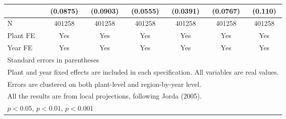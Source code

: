 \begin{table}[htbp]
\begin{tabular}{l*{6}{c}}
                & (0.0875)         & (0.0903)         & (0.0555)         & (0.0391)         & (0.0767)         &  (0.110)         \\
\midrule
N               &   401258         &   401258         &   401258         &   401258         &   401258         &   401258         \\
Plant FE        &      Yes         &      Yes         &      Yes         &      Yes         &      Yes         &      Yes         \\
Year FE         &      Yes         &      Yes         &      Yes         &      Yes         &      Yes         &      Yes         \\
\bottomrule
\multicolumn{7}{l}{\footnotesize Standard errors in parentheses}\\
\multicolumn{7}{l}{\footnotesize Plant and year fixed effects are included in each specification. All variables are real values.}\\
\multicolumn{7}{l}{\footnotesize Errors are clustered on both plant-level and region-by-year level.}\\
\multicolumn{7}{l}{\footnotesize All the results are from local projections, following Jorda (2005).}\\
\multicolumn{7}{l}{\footnotesize \sym{*} \(p<0.05\), \sym{**} \(p<0.01\), \sym{***} \(p<0.001\)}\\
\end{tabular}
\end{table}

